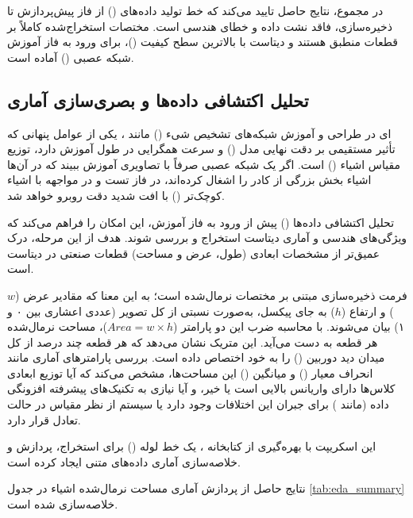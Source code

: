 \documentclass{article}
\begin{document}
در مجموع، نتایج حاصل تایید می‌کند که خط تولید داده‌های  () از فاز پیش‌پردازش تا ذخیره‌سازی، فاقد نشت داده و خطای هندسی است. مختصات استخراج‌شده کاملاً بر قطعات منطبق هستند و دیتاست با بالاترین سطح کیفیت ()، برای ورود به فاز آموزش شبکه عصبی () آماده است.


\subsection{تحلیل اکتشافی داده‌ها  و بصری‌سازی آماری}

ای
در طراحی و آموزش شبکه‌های تشخیص شیء () مانند ، یکی از عوامل پنهانی که تأثیر مستقیمی بر دقت نهایی مدل () و سرعت همگرایی در طول آموزش دارد، توزیع مقیاس اشیاء () است. اگر یک شبکه عصبی صرفاً با تصاویری آموزش ببیند که در آن‌ها اشیاء بخش بزرگی از کادر را اشغال کرده‌اند، در فاز تست و در مواجهه با اشیاء کوچک‌تر () با افت شدید دقت روبرو خواهد شد.

تحلیل اکتشافی داده‌ها () پیش از ورود به فاز آموزش، این امکان را فراهم می‌کند که ویژگی‌های هندسی و آماری دیتاست استخراج و بررسی شوند. هدف از این مرحله، درک عمیق‌تر از مشخصات ابعادی (طول، عرض و مساحت) قطعات صنعتی در دیتاست است.

فرمت ذخیره‌سازی  مبتنی بر مختصات نرمال‌شده است؛ به این معنا که مقادیر عرض ($w$) و ارتفاع ($h$) به جای پیکسل، به‌صورت نسبتی از کل تصویر (عددی اعشاری بین ۰ و ۱) بیان می‌شوند. با محاسبه ضرب این دو پارامتر ($Area = w \times h$)، مساحت نرمال‌شده هر قطعه به دست می‌آید. این متریک نشان می‌دهد که هر قطعه چند درصد از کل میدان دید دوربین () را به خود اختصاص داده است. بررسی پارامترهای آماری مانند انحراف معیار () و میانگین () این مساحت‌ها، مشخص می‌کند که آیا توزیع ابعادی کلاس‌ها دارای واریانس بالایی است یا خیر، و آیا نیازی به تکنیک‌های پیشرفته افزونگی داده (مانند ) برای جبران این اختلافات وجود دارد یا سیستم از نظر مقیاس در حالت تعادل قرار دارد.

این اسکریپت با بهره‌گیری از کتابخانه ، یک خط لوله () برای استخراج، پردازش و خلاصه‌سازی آماری داده‌های متنی  ایجاد کرده است.


نتایج حاصل از پردازش آماری مساحت نرمال‌شده اشیاء در جدول \ref{tab:eda_summary} خلاصه‌سازی شده است.
\end{document}
